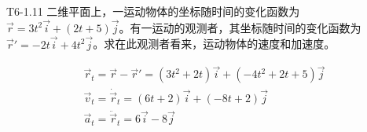 \documentclass[UTF8]{ctexart} %
\begin{document}
\begin{question}{T6-1.11}
二维平面上，一运动物体的坐标随时间的变化函数为 \(\vec{r} = 3t^2 \vec{i} + (2t+5) \vec{j}\)。有一运动的观测者，其坐标随时间的变化函数为 \(\vec{r}' = -2t \vec{i} + 4t^2 \vec{j}\)。求在此观测者看来，运动物体的速度和加速度。
\end{question}
\begin{solve}
\[
\begin{gathered}
\vec r_t=\vec r-\vec r'=(3t^2+2t)\vec i+(-4t^2+2t+5)\vec j \\
\vec v_t=\dot{\vec r}_t=(6t+2)\vec i+(-8t+2)\vec j \\
\vec a_t=\ddot{\vec r}_t=6\vec i-8\vec j
\end{gathered}
\]

\end{solve}
\end{document}
